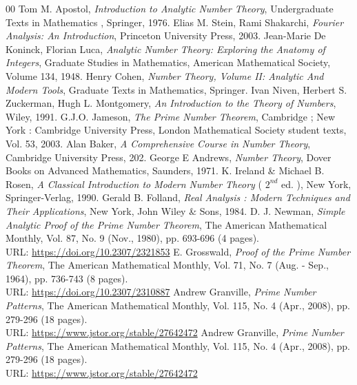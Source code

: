 \documentclass[article,12pt]{elsarticle}
\begin{document}
		
		\begin{thebibliography}{00}
		  Tom M. Apostol,
		\emph{ Introduction to Analytic Number Theory},
		Undergraduate Texts in Mathematics ,
		Springer,
		1976.
		  Elias M. Stein, Rami Shakarchi,
		\emph{ Fourier Analysis: An Introduction},
		Princeton University Press, 
		2003.
		  Jean-Marie De Koninck, Florian Luca,
		\emph{Analytic Number Theory: Exploring the Anatomy of Integers},
		Graduate Studies in Mathematics, 
		American Mathematical Society,
		Volume 134, 
		1948.
		  Henry Cohen,
		\emph{ Number Theory, Volume II: Analytic And Modern Tools},
		Graduate Texts in Mathematics, 
		Springer.
		  Ivan Niven, Herbert S. Zuckerman, Hugh L. Montgomery,
		\emph{ An Introduction to the Theory of Numbers},
		Wiley, 
		1991.
		  G.J.O. Jameson,
		\emph{The Prime Number Theorem},
		Cambridge ; New York : Cambridge University Press, 
		London Mathematical Society student texts,
		Vol. 53,
		2003. 
		  Alan Baker,
		\emph{A Comprehensive Course in Number Theory},
		Cambridge University Press,
		202.
		  George E Andrews,
		\emph{Number Theory},
		Dover Books on Advanced Mathematics, 
		Saunders, 
		1971.
		  K. Ireland \& Michael B. Rosen,
		\emph{  A Classical Introduction to Modern Number Theory} ( $2^{nd}$ ed. ), New York, Springer-Verlag, 1990. 
		  Gerald B. Folland,
		\emph{	Real Analysis : Modern Techniques and Their Applications}, New York, John Wiley \& Sons, 1984.
		  D. J. Newman,
		\emph{	Simple Analytic Proof of the Prime Number Theorem}, The American Mathematical Monthly, Vol. 87, No. 9 (Nov., 1980), pp. 693-696 (4 pages).\\
		URL: \url{https://doi.org/10.2307/2321853}
		 E. Grosswald,
		\emph{ Proof of the Prime Number Theorem}, The American Mathematical Monthly, Vol. 71, No. 7 (Aug. - Sep., 1964), pp. 736-743 (8 pages).\\
		URL: \url{https://doi.org/10.2307/2310887}
		  Andrew Granville,
		\emph{	Prime Number Patterns}, The American Mathematical Monthly, Vol. 115, No. 4 (Apr., 2008), pp. 279-296 (18 pages).\\
		URL: \url{https://www.jstor.org/stable/27642472}
		  Andrew Granville,
		\emph{	Prime Number Patterns}, The American Mathematical Monthly, Vol. 115, No. 4 (Apr., 2008), pp. 279-296 (18 pages).\\
		URL: \url{https://www.jstor.org/stable/27642472}
		
		
		
		\end{thebibliography}
		
		
		
		
		
		
		
		
		
	
\end{document}

